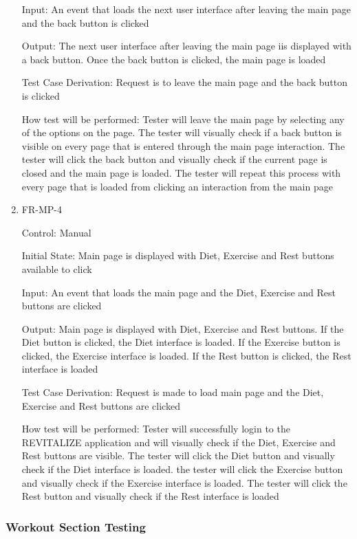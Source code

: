 \documentclass[12pt, titlepage]{article}
\begin{document}
\begin{enumerate}
Input: An event that loads the next user interface after leaving the main page and the back button is clicked
					
Output: The next user interface after leaving the main page iis displayed with a back button. Once the back button is clicked, the main page is loaded

Test Case Derivation: Request is to leave the main page and the back button is clicked

How test will be performed: Tester will leave the main page by selecting any of the options on the page. The tester will visually check if a back button is visible on every page that is entered through the main page interaction. The tester will click the back button and visually check if the current page is closed and the main page is loaded. The tester will repeat this process with every page that is  loaded from clicking an interaction from the main page
					
\item{FR-MP-4\\}

Control: Manual
					
Initial State: Main page is displayed with Diet, Exercise and Rest buttons available to click
					
Input: An event that loads the main page and the Diet, Exercise and Rest buttons are clicked

Output: Main page is displayed with Diet, Exercise and Rest buttons. If the Diet button is clicked, the Diet interface is loaded. If the Exercise button is clicked, the Exercise interface is loaded. If the Rest button is clicked, the Rest interface is loaded

Test Case Derivation: Request is made to load main page and the Diet, Exercise and Rest buttons are clicked

How test will be performed: Tester will successfully login to the REVITALIZE application and will visually check if the Diet, Exercise and Rest buttons are visible. The tester will click the Diet button and visually check if the Diet interface is loaded. the tester will click the Exercise button and visually check if the Exercise interface is loaded. The tester will click the Rest button and visually check if the Rest interface is loaded

\end{enumerate}

\subsubsection{Workout Section Testing}
\end{document}
